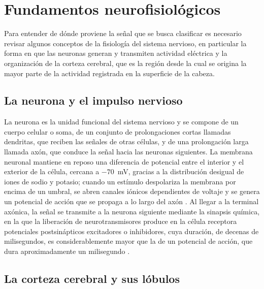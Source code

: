 \section[FUNDAMENTOS NEUROFISIOLÓGICOS]{Fundamentos neurofisiológicos}
\label{sec:neuro}

Para entender de dónde proviene la señal que se busca clasificar es necesario revisar algunos
conceptos de la fisiología del sistema nervioso, en particular la forma en que las neuronas generan
y transmiten actividad eléctrica y la organización de la corteza cerebral, que es la región desde
la cual se origina la mayor parte de la actividad registrada en la superficie de la cabeza.

\subsection{La neurona y el impulso nervioso}

La neurona es la unidad funcional del sistema nervioso y se compone de un cuerpo celular o soma,
de un conjunto de prolongaciones cortas llamadas dendritas, que reciben las señales de otras
células, y de una prolongación larga llamada axón, que conduce la señal hacia las neuronas
siguientes. La membrana neuronal mantiene en reposo una diferencia de potencial entre el interior y
el exterior de la célula, cercana a $-70$~mV, gracias a la distribución desigual de iones de sodio y
potasio; cuando un estímulo despolariza la membrana por encima de un umbral, se abren canales
iónicos dependientes de voltaje y se genera un potencial de acción que se propaga a lo largo del
axón \cite{guyton2016}. Al llegar a la terminal axónica, la señal se transmite a la neurona
siguiente mediante la sinapsis química, en la que la liberación de neurotransmisores produce en la
célula receptora potenciales postsinápticos excitadores o inhibidores, cuya duración, de decenas
de milisegundos, es considerablemente mayor que la de un potencial de acción, que dura
aproximadamente un milisegundo \cite{ganong2010}.

\subsection{La corteza cerebral y sus lóbulos}

